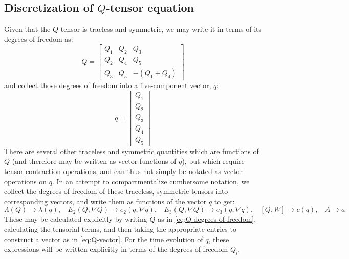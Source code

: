 \documentclass[reqno]{article}
\begin{document}
  \subsection{Discretization of $Q$-tensor equation}
  Given that the $Q$-tensor is tracless and symmetric, we may write it in terms
  of its degrees of freedom as:
  \begin{equation} \label{eq:Q-degrees-of-freedom}
    Q
    =
    \begin{bmatrix}
      Q_1 & Q_2 & Q_3 \\
      Q_2 & Q_4 & Q_5 \\
      Q_3 & Q_5 & -(Q_1 + Q_4)
    \end{bmatrix}
  \end{equation}
  and collect those degrees of freedom into a five-component vector, $q$:
  \begin{equation} \label{eq:Q-vector}
    q
    =
    \begin{bmatrix}
      Q_1 \\
      Q_2 \\
      Q_3 \\
      Q_4 \\
      Q_5
    \end{bmatrix}
  \end{equation}
  There are several other traceless and symmetric quantities which are functions
  of $Q$ (and therefore may be written as vector functions of $q$), but which
  require tensor contraction operations, and can thus not simply be notated as
  vector operations on $q$.
  In an attempt to compartmentalize cumbersome notation, we collect the degrees
  of freedom of these traceless, symmetric tensors into corresponding vectors,
  and write them as functions of the vector $q$ to get:
  \begin{equation}
    \Lambda (Q) \to \lambda(q), \:\:\:\:
    E_2(Q, \nabla Q) \to e_2(q, \nabla q), \:\:\:\:
    E_3(Q, \nabla Q) \to e_3(q, \nabla q), \:\:\:\: 
    [Q, W] \to c(q), \:\:\:\:
    A \to a
  \end{equation}
  These may be calculated explicitly by writing $Q$ as in
  \eqref{eq:Q-degrees-of-freedom}, calculating the tensorial terms, and then
  taking the appropriate entries to construct a vector as in
  \eqref{eq:Q-vector}.
  For the time evolution of $q$, these expressions will be written explicitly in terms of the
  degrees of freedom $Q_i$.
\end{document}
